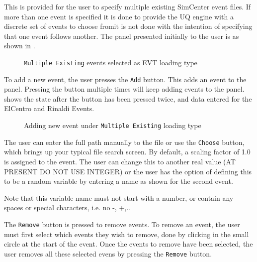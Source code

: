 This is provided for the user to specify multiple existing SimCenter
event files.  If more than one event is specified it is done to
provide the UQ engine with a discrete set of events to choose
from\textemdash it is not done with the intention of specifying that
one event follows another.  The panel presented initially to the user
is as shown in .

\begin{figure}[!htbp]
  \caption{\texttt{Multiple Existing} events selected as EVT loading type}
  \label{fig:figure4}
\end{figure}

To add a new event, the user presses the \texttt{Add} button. This adds an
event to the panel. Pressing the button multiple times will keep
adding events to the panel.  shows the state after
the button has been pressed twice, and data entered for the ElCentro
and Rinaldi Events.

\begin{figure}[!htbp]
  \caption{Adding new event under \texttt{Multiple Existing} loading type}
  \label{fig:figure5}
\end{figure}

The user can enter the full path manually to the file or use the
\texttt{Choose} button, which brings up your typical file search screen.  By
default, a scaling factor of 1.0 is assigned to the event.  The user
can change this to another real value (AT PRESENT DO NOT USE INTEGER)
or the user has the option of defining this to be a random variable by
entering a name as shown for the second event.

Note that this variable name must not start with a number, or contain
any spaces or special characters, i.e. no -, +,..

The \texttt{Remove} button is pressed to remove events. To remove an
event, the user must first select which events they wish to remove,
done by clicking in the small circle at the start of the event. Once
the events to remove have been selected, the user removes all these
selected evens by pressing the \texttt{Remove} button.

